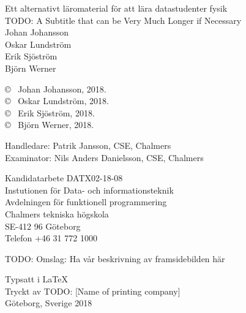 \newpage
\thispagestyle{plain}
\vspace*{0cm}
Ett alternativt läromaterial för att lära datastudenter fysik\\
TODO: A Subtitle that can be Very Much Longer if Necessary\\
Johan Johansson \\
Oskar Lundström \\
Erik Sjöström \\
Björn Werner
\setlength{\parskip}{1cm}

\copyright ~ Johan Johansson, 2018. \setlength{\parskip}{1cm} \\
\copyright ~ Oskar Lundström, 2018. \setlength{\parskip}{1cm} \\
\copyright ~ Erik Sjöström, 2018. \setlength{\parskip}{1cm} \\
\copyright ~ Björn Werner, 2018. \setlength{\parskip}{1cm}

Handledare: Patrik Jansson, CSE, Chalmers\\
Examinator: Nils Anders Danielsson, CSE, Chalmers \setlength{\parskip}{1cm}

Kandidatarbete DATX02-18-08 \\
Instutionen för Data- och informationsteknik \\
Avdelningen för funktionell programmering\\
Chalmers tekniska högskola\\
SE-412 96 Göteborg\\
Telefon +46 31 772 1000
\setlength{\parskip}{0.5cm}%

\vfill
TODO: Omslag: Ha vår beskrivning av framsidebilden här

Typsatt i \LaTeX \\
Tryckt av TODO: [Name of printing company]\\
Göteborg, Sverige 2018

